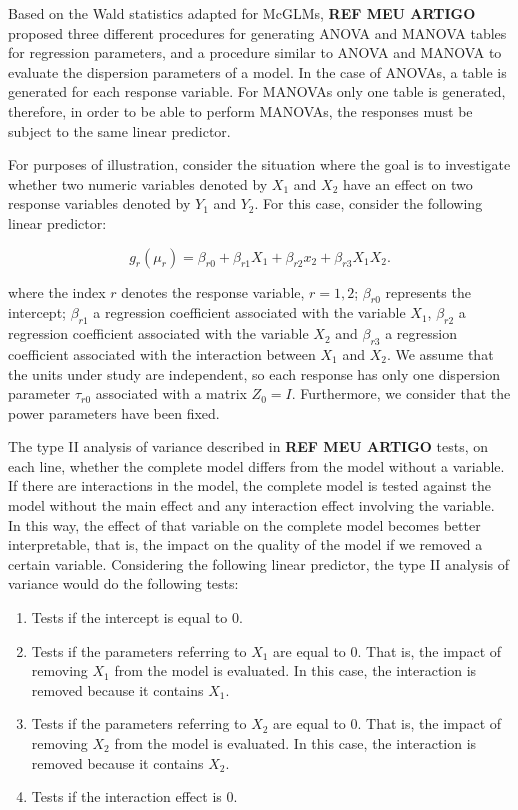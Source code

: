 \documentclass[article]{jss}\usepackage[]{graphicx}\usepackage[]{xcolor}
\begin{document}
Based on the Wald statistics adapted for McGLMs, \textbf{REF MEU ARTIGO} proposed three different procedures for generating ANOVA and MANOVA tables for regression parameters, and a procedure similar to ANOVA and MANOVA to evaluate the dispersion parameters of a model. In the case of ANOVAs, a table is generated for each response variable. For MANOVAs only one table is generated, therefore, in order to be able to perform MANOVAs, the responses must be subject to the same linear predictor.

For purposes of illustration, consider the situation where the goal is to investigate whether two numeric variables denoted by $X_1$ and $X_2$ have an effect on two response variables denoted by $Y_1$ and $Y_2$. For this case, consider the following linear predictor:

$$
g_r(\mu_r) = \beta_{r0} + \beta_{r1} X_1 + \beta_{r2} x_2 + \beta_{r3} X_1X_2.
$$

\noindent where the index $r$ denotes the response variable, $r = 1,2$; $\beta_{r0}$ represents the intercept; $\beta_{r1}$ a regression coefficient associated with the variable $X_1$, $\beta_{r2}$ a regression coefficient associated with the variable $X_2$ and $\beta_{r3}$ a regression coefficient associated with the interaction between $X_1$ and $X_2$. We assume that the units under study are independent, so each response has only one dispersion parameter $\tau_{r0}$ associated with a matrix $Z_0 = I$. Furthermore, we consider that the power parameters have been fixed.

The type II analysis of variance described in \textbf{REF MEU ARTIGO} tests, on each line, whether the complete model differs from the model without a variable. If there are interactions in the model, the complete model is tested against the model without the main effect and any interaction effect involving the variable. In this way, the effect of that variable on the complete model becomes better interpretable, that is, the impact on the quality of the model if we removed a certain variable. Considering the following linear predictor, the type II analysis of variance would do the following tests:

\begin{enumerate}
  \item Tests if the intercept is equal to $0$.
  
  \item Tests if the parameters referring to $X_1$ are equal to $0$. That is, the impact of removing $X_1$ from the model is evaluated. In this case, the interaction is removed because it contains $X_1$.
  
  \item Tests if the parameters referring to $X_2$ are equal to $0$. That is, the impact of removing $X_2$ from the model is evaluated. In this case, the interaction is removed because it contains $X_2$.
  
  \item Tests if the interaction effect is $0$.

\end{enumerate}
\end{document}
